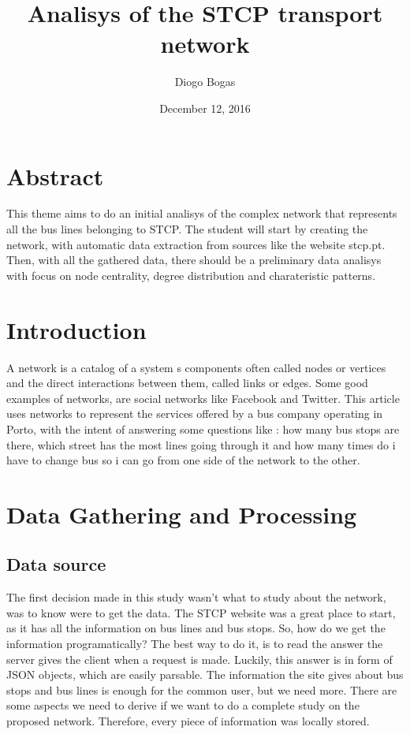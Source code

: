 \documentclass[12pt]{article}
\title{Analisys of the STCP transport network}
\author{Diogo Bogas}
\affil{DCC/FCUP}
\date{December 12, 2016}
\begin{document}
\maketitle
\newpage
{}

\tableofcontents


\section{Abstract}
This theme aims to do an initial analisys of the complex network that represents all the bus lines belonging to STCP. The student will start by creating the network, with automatic data extraction from sources like the website stcp.pt.
Then, with all the gathered data, there should be a preliminary data analisys with focus on node centrality, degree distribution and charateristic patterns.



\section{Introduction}

A network is a catalog of a system\textsc{} s components often called nodes or vertices and the direct interactions  between them, called links or edges.
Some good examples of networks, are social networks like Facebook and Twitter.
This article uses networks to represent the services offered by a bus company operating in Porto, with the intent of answering some questions like : how many bus stops are there, which street has the most lines going through it and how many times do i have to change bus so i can go from one side of the network to the other. 
 

\section{Data Gathering and Processing}
\subsection{Data source}
The first decision made in this study wasn't what to study about the network, was to know were to get the data. 
The STCP website was a great place to start, as it has all the information on bus lines and bus stops. So, how do we get the information programatically?
The best way to do it, is to read the answer the server gives the client when a request is made. Luckily, this answer is in form of JSON objects, which are easily parsable.
The information the site gives about bus stops and bus lines is enough for the common user, but we need more. There are some aspects we need to derive if we want to do a complete study on the proposed network. Therefore, every piece of information was locally stored.
\end{document}
